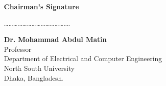 \begin{titlepage}
\vfill

\begin{flushleft}
\textbf{Chairman’s Signature}

\vspace{2em}

…………………………………….

\textbf{Dr. Mohammad Abdul Matin } \\
Professor \\
Department of Electrical and Computer Engineering \\
North South University \\
Dhaka, Bangladesh.
\end{flushleft}

\vfill

\end{titlepage}
